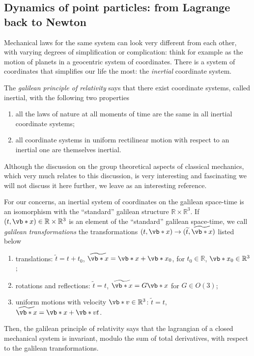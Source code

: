 \documentclass[english,fontsize=11pt,paper=b5]{scrbook}
\theoremstyle{definition}
\begin{document}
    \subsection{Dynamics of point particles: from Lagrange back to Newton}\label{sec:dynamicspps}

    Mechanical laws for the same system can look very different from each other, with varying degrees of simplification or complication: think for example as the motion of planets in a geocentric system of coordinates.
    There is a system of coordinates that simplifies our life the most: the \emph{inertial} coordinate system.

    \begin{tcolorbox}
      The \emph{galilean principle of relativity} says that there exist coordinate systems, called inertial, with the following two properties
      \begin{enumerate}
        \item all the laws of nature at all moments of time are the same in all inertial coordinate systems;
        \item all coordinate systems in uniform rectilinear motion with respect to an inertial one are themselves inertial.
      \end{enumerate}
    \end{tcolorbox}

    Although the discussion on the group theoretical aspects of classical mechanics, which very much relates to this discussion, is very interesting and fascinating we will not discuss it here further, we leave \cite{book:marsdenratiu} as an interesting reference.

    For our concerns, an inertial system of coordinates on the galilean space-time is an isomorphism with the ``standard'' galilean structure $\mathbb{R}\times\mathbb{R}^3$.
    If $(t, \vb*{x}) \in \mathbb{R}\times \mathbb{R}^3$ is an element of the ``standard'' galilean space-time, we call \emph{galilean transformations} the transformations $(t,\vb*{x}) \to (\widetilde t, \widetilde{\vb*{x}})$ listed below
    \begin{enumerate}
      \item translations: $\widetilde t = t + t_0$, $\widetilde{\vb*{x}} = \vb*{x} + \vb*{x}_0$, for $t_0\in\mathbb{R}$, $\vb*{x}_0\in\mathbb{R}^3$;
      \item rotations and reflections: $\widetilde t = t$, $\widetilde{\vb*{x}} = G\vb*{x}$ for $G\in O(3)$;
      \item uniform motions with velocity $\vb*{v}\in\mathbb{R}^3$: $\widetilde t = t$, $\widetilde{\vb*{x}} = \vb*{x} + \vb*{v} t$.
    \end{enumerate}
    Then, the galilean principle of relativity says that the lagrangian of a closed mechanical system is invariant, modulo the sum of total derivatives, with respect to the galilean transformations.
\end{document}
